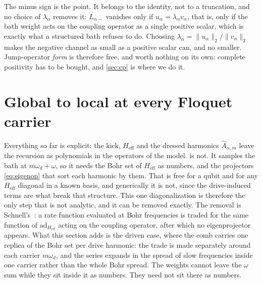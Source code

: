 \documentclass[a4paper,11pt]{article}
\newcommand{\eff}{\mathrm{eff}}
\newcommand{\ad}{\mathrm{ad}}
\begin{document}
The minus sign is the point. It belongs to the identity, not to a truncation, and no choice of $\lambda_\alpha$ removes it: $L_{\alpha-}$ vanishes only if $u_\alpha = \lambda_\alpha v_\alpha$, that is, only if the bath weight acts on the coupling operator as a single positive scalar, which is exactly what a structured bath refuses to do. Choosing $\lambda_\alpha = \lVert u_\alpha\rVert_2/\lVert v_\alpha\rVert_2$ makes the negative channel as small as a positive scalar can, and no smaller. Jump-operator \emph{form} is therefore free, and worth nothing on its own: complete positivity has to be bought, and \cref{sec:cp} is where we do it.

\section{Global to local at every Floquet carrier}\label{sec:filter}

Everything so far is explicit: the kick, $H_\eff$ and the dressed harmonics $\hat A_{\alpha,m}$ leave the recursion as polynomials in the operators of the model.  is not. It samples the bath at $m\omega_d+\omega$, so it needs the Bohr set of $H_\eff$ as numbers, and the projectors \eqref{eq:eigenop} that sort each harmonic by them. That is free for a qubit and for any $H_\eff$ diagonal in a known basis, and generically it is not, since the drive-induced terms are what break that structure. This one diagonalization is therefore the only step that is not analytic, and it can be removed exactly. The removal is Schnell's~\cite{Schnell2025Global}: a rate function evaluated at Bohr frequencies is traded for the same function of $\ad_{H_\eff}$ acting on the coupling operator, after which no eigenprojector appears. What this section adds is the driven case, where the comb carries one replica of the Bohr set per drive harmonic: the trade is made separately around each carrier $m\omega_d$, and the series expands in the spread of slow frequencies inside one carrier rather than the whole Bohr spread. The weights cannot leave the $\omega$ sum while they sit inside it as numbers. They need not sit there as numbers.
\end{document}
